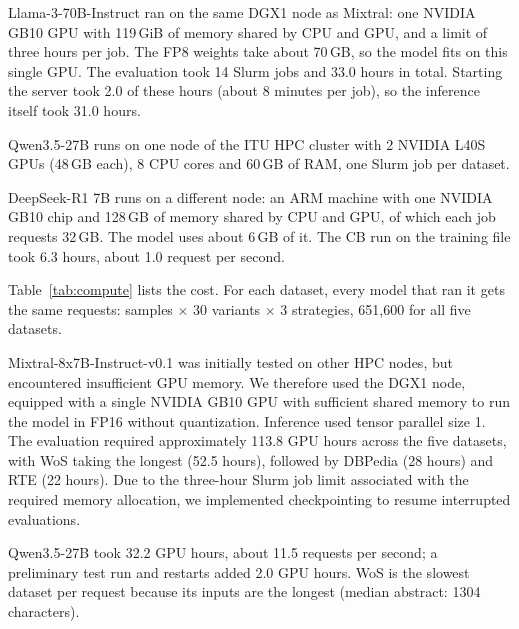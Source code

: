 \par\medskip

Llama-3-70B-Instruct ran on the same DGX1 node as Mixtral: one NVIDIA GB10
GPU with 119\,GiB of memory shared by CPU and GPU, and a limit of three hours per job. The FP8 weights take about 70\,GB, so the model fits on this single GPU. The evaluation took 14 Slurm jobs and 33.0 hours in total. Starting the server took 2.0 of these hours (about 8 minutes per job), so the inference itself took 31.0 hours.

\par\medskip

Qwen3.5-27B runs on one node of the ITU HPC cluster with 2 NVIDIA L40S GPUs
(48\,GB each), 8 CPU cores and 60\,GB of RAM, one Slurm job per dataset.

\par\medskip

DeepSeek-R1 7B runs on a different node: an ARM machine with one NVIDIA GB10
chip and 128\,GB of memory shared by CPU and GPU, of which each job requests
32\,GB. The model uses about 6\,GB of it. The CB run on the training file
took 6.3 hours, about 1.0 request per second.

\par\medskip

 Table~\ref{tab:compute}
lists the cost. For each dataset, every model that ran it gets the same
requests: samples $\times$ 30 variants $\times$ 3 strategies, 651{,}600 for
all five datasets. 

\par\medskip

Mixtral-8x7B-Instruct-v0.1 was initially tested on
other HPC nodes, but encountered insufficient GPU
memory. We therefore used the DGX1 node, equipped
with a single NVIDIA GB10 GPU with sufficient shared
memory to run the model in FP16 without quantization.
Inference used tensor parallel size 1. The evaluation
required approximately 113.8 GPU hours across the
five datasets, with WoS taking the longest (52.5 hours),
followed by DBPedia (28 hours) and RTE (22 hours).
Due to the three-hour Slurm job limit associated
with the required memory allocation, we implemented
checkpointing to resume interrupted evaluations.

\par\medskip

Qwen3.5-27B took 32.2 GPU
hours, about 11.5 requests per second; a preliminary test run and restarts
added 2.0 GPU hours. WoS is the slowest dataset per request because its inputs
are the longest (median abstract: 1304 characters).


